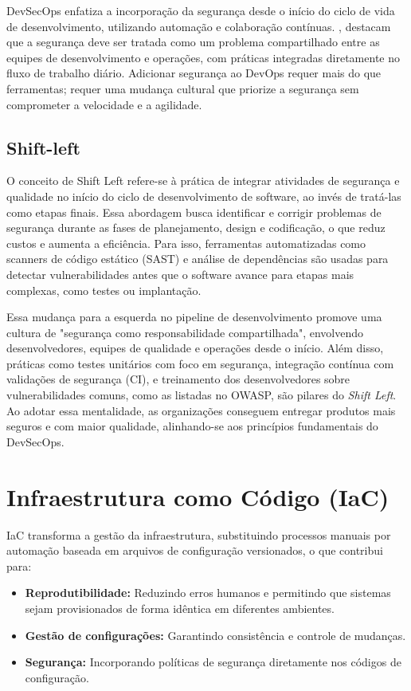 DevSecOps enfatiza a incorporação da segurança desde o início do ciclo de vida de desenvolvimento, utilizando automação e colaboração contínuas. , destacam que a segurança deve ser tratada como um problema compartilhado entre as equipes de desenvolvimento e operações, com práticas integradas diretamente no fluxo de trabalho diário. Adicionar segurança ao DevOps requer mais do que ferramentas; requer uma mudança cultural que priorize a segurança sem comprometer a velocidade e a agilidade\cite{vehent2018securing}.

\subsection{Shift-left}
O conceito de Shift Left refere-se à prática de integrar atividades de segurança e qualidade no início do ciclo de desenvolvimento de software, ao invés de tratá-las como etapas finais. Essa abordagem busca identificar e corrigir problemas de segurança durante as fases de planejamento, design e codificação, o que reduz custos e aumenta a eficiência. Para isso, ferramentas automatizadas como scanners de código estático (SAST) e análise de dependências são usadas para detectar vulnerabilidades antes que o software avance para etapas mais complexas, como testes ou implantação.

Essa mudança para a esquerda no pipeline de desenvolvimento promove uma cultura de "segurança como responsabilidade compartilhada", envolvendo desenvolvedores, equipes de qualidade e operações desde o início. Além disso, práticas como testes unitários com foco em segurança, integração contínua com validações de segurança (CI), e treinamento dos desenvolvedores sobre vulnerabilidades comuns, como as listadas no OWASP, são pilares do \textit{Shift Left}. Ao adotar essa mentalidade, as organizações conseguem entregar produtos mais seguros e com maior qualidade, alinhando-se aos princípios fundamentais do DevSecOps.



\section{Infraestrutura como Código (IaC)}
IaC transforma a gestão da infraestrutura, substituindo processos manuais por automação baseada em arquivos de configuração versionados, o que contribui para:

\begin{itemize}
    \item\textbf{Reprodutibilidade:} Reduzindo erros humanos e permitindo que sistemas sejam provisionados de forma idêntica em diferentes ambientes.
    \item\textbf{Gestão de configurações:} Garantindo consistência e controle de mudanças.
    \item\textbf{Segurança:} Incorporando políticas de segurança diretamente nos códigos de configuração.
\end{itemize}

